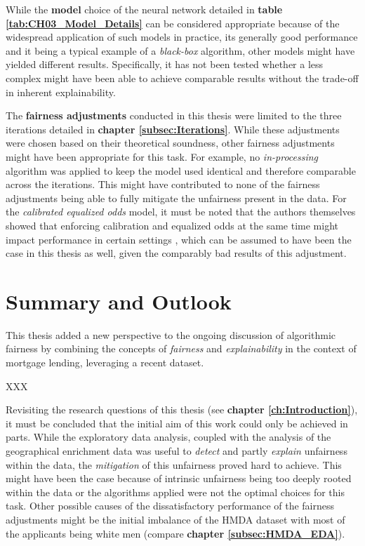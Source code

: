 While the \textbf{model} choice of the neural network detailed in \textbf{table \ref{tab:CH03_Model_Details}} can be considered appropriate because of the widespread application of such models in practice, its generally good performance and it being a typical example of a \textit{black-box} algorithm, other models might have yielded different results.
Specifically, it has not been tested whether a less complex might have been able to achieve comparable results without the trade-off in inherent explainability.


The \textbf{fairness adjustments} conducted in this thesis were limited to the three iterations detailed in \textbf{chapter \ref{subsec:Iterations}}. While these adjustments were chosen based on their theoretical soundness, other fairness adjustments might have been appropriate for this task.
For example, no \textit{in-processing} algorithm was applied to keep the model used identical and therefore comparable across the iterations. This might have contributed to none of the fairness adjustments being able to fully mitigate the unfairness present in the data.
For the \textit{calibrated equalized odds} model, it must be noted that the authors themselves showed that enforcing calibration and equalized odds at the same time might impact performance in certain settings \parencite{Pleiss2017}, which can be assumed to have been the case in this thesis as well, given the comparably bad results of this adjustment.

\section{Summary and Outlook}\label{sec:summary}


This thesis added a new perspective to the ongoing discussion of algorithmic fairness by combining the concepts of \textit{fairness} and \textit{explainability} in the context of mortgage lending, leveraging a recent dataset.

XXX

Revisiting the research questions of this thesis (see \textbf{chapter \ref{ch:Introduction}}), it must be concluded that the initial aim of this work could only be achieved in parts. 
While the exploratory data analysis, coupled with the analysis of the geographical enrichment data was useful to \textit{detect} and partly \textit{explain} unfairness within the data, the \textit{mitigation} of this unfairness proved hard to achieve. 
This might have been the case because of intrinsic unfairness being too deeply rooted within the data or the algorithms applied were not the optimal choices for this task.
Other possible causes of the dissatisfactory performance of the fairness adjustments might be the initial imbalance of the HMDA dataset with most of the applicants being white men (compare \textbf{chapter \ref{subsec:HMDA_EDA}}).

